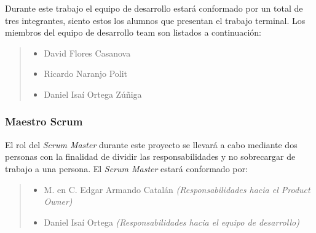  Durante este trabajo el equipo de desarrollo estará conformado por un total de
 tres integrantes, siento estos los alumnos que presentan el trabajo terminal. Los miembros del
 equipo de desarrollo team son listados a continuación:

    \begin{quote}
    \begin{itemize}
        \item David Flores Casanova
        \item Ricardo Naranjo Polit
        \item Daniel Isaí Ortega Zúñiga
    \end{itemize}
    \end{quote}






\subsubsection{Maestro Scrum}

 El rol del {\it Scrum Master} durante este proyecto se llevará a cabo mediante
 dos personas con la finalidad de dividir las responsabilidades y no sobrecargar de trabajo
 a una persona. El {\it Scrum Master} estará conformado por:

    \begin{quote}
    \begin{itemize}
        \item M. en C. Edgar Armando Catalán {\it (Responsabilidades hacia el Product Owner)}
        \item Daniel Isaí Ortega {\it(Responsabilidades hacia el equipo de desarrollo)}
    \end{itemize}
    \end{quote}


